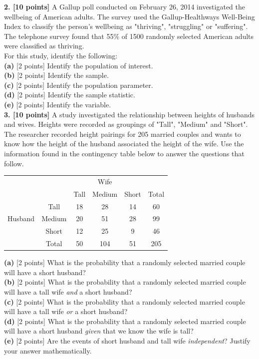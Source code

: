 \documentclass[11pt]{isuthesis}\usepackage[]{graphicx}\usepackage[]{color}
\begin{document}
\begin{appendices}
\textbf{2. [10 points]} A Gallup poll conducted on February 26, 2014 investigated the wellbeing of American adults. The survey used the Gallup-Healthways Well-Being Index to classify the person's wellbeing as "thriving", "struggling" or "suffering". The telephone survey found that 55\% of 1500 randomly selected American adults were classified as thriving.  \\
For this study, identify the following:\\
\noindent\textbf{(a)} [2 points] Identify the population of interest.\\
\noindent\textbf{(b)} [2 points] Identify the sample.\\
\noindent\textbf{(c)} [2 points] Identify the population parameter.\\
\noindent\textbf{(d)} [2 points] Identify the sample statistic.\\
\noindent\textbf{(e)} [2 points] Identify the variable.\\


\textbf{3. [10  points]} A study investigated the relationship between heights of husbands and wives. Heights were recorded as groupings of "Tall", "Medium" and "Short". The researcher recorded height pairings for 205 married couples and wants to know how the height of the husband associated the height of the wife. Use the information found in the contingency table below to answer the questions that follow.
\begin{table}[hbtp]\centering 
\begin{tabular}{ |cc|ccc|c|}
  \hline                        
  & & & Wife & & \\
  & & Tall & Medium & Short & Total \\
 \hline
          & Tall    & 18 & 28  & 14  & 60  \\
Husband   & Medium  & 20 & 51  & 28  & 99  \\
          & Short   & 12 & 25  & 9   &  46 \\
  \hline  
  & Total & 50 & 104 & 51 & 205 \\
  \hline
\end{tabular}
\end{table}
\noindent\textbf{(a)} [2  points] What is the probability that a randomly selected married couple will have a short husband?\\
\noindent\textbf{(b)} [2  points] What is the probability that a randomly selected married couple will have a tall wife \textit{and} a short husband?\\
\noindent\textbf{(c)} [2  points] What is the probability that a randomly selected married couple will have a tall wife \textit{or} a short husband?\\
\noindent\textbf{(d)} [2  points] What is the probability that a randomly selected married couple will have a short husband \textit{given} that we know the wife is tall?\\
\noindent\textbf{(e)} [2  points] Are the events of short husband and tall wife \textit{independent}? Justify your answer mathematically.\\


\end{appendices}
\end{document}
